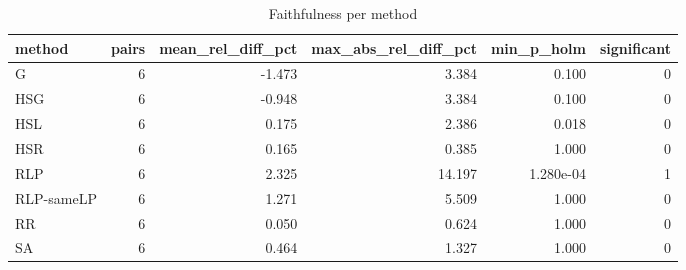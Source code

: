 \begin{table}[htbp]
\centering
\small
\caption{Faithfulness per method}
\label{tab:faithfulness_summary}
\begin{tabular}{lrrrrr}
\toprule
method & pairs & mean\_rel\_diff\_pct & max\_abs\_rel\_diff\_pct & min\_p\_holm & significant \\
\midrule
G & 6 & -1.473 & 3.384 & 0.100 & 0 \\
HSG & 6 & -0.948 & 3.384 & 0.100 & 0 \\
HSL & 6 & 0.175 & 2.386 & 0.018 & 0 \\
HSR & 6 & 0.165 & 0.385 & 1.000 & 0 \\
RLP & 6 & 2.325 & 14.197 & 1.280e-04 & 1 \\
RLP-sameLP & 6 & 1.271 & 5.509 & 1.000 & 0 \\
RR & 6 & 0.050 & 0.624 & 1.000 & 0 \\
SA & 6 & 0.464 & 1.327 & 1.000 & 0 \\
\bottomrule
\end{tabular}
\end{table}
